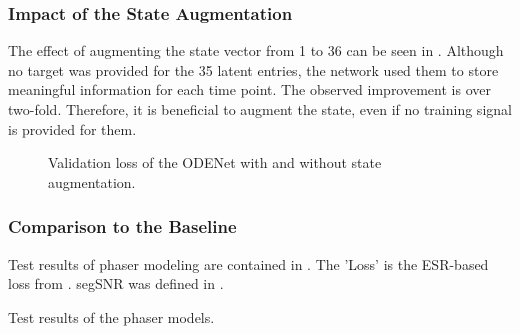\subsubsection{Impact of the State Augmentation}
The effect of augmenting the state vector from 1 to 36 can be seen in . Although no target was provided for the 35 latent entries, the network used them to store meaningful information for each time point. The observed improvement is over two-fold. Therefore, it is beneficial to augment the state, even if no training signal is provided for them.

\begin{figure}
    \centering
    
    \caption{Validation loss of the ODENet with and without state augmentation.}
    \label{fig:state_augmentation}
\end{figure}

\subsubsection{Comparison to the Baseline}

Test results of phaser modeling are contained in . The 'Loss' is the \ac{ESR}-based loss from . \ac{segSNR} was defined in .

\begin{table}[]
    \caption{Test results of the phaser models.}
    \centering
    
    \label{tab:phaser_results}
\end{table}

